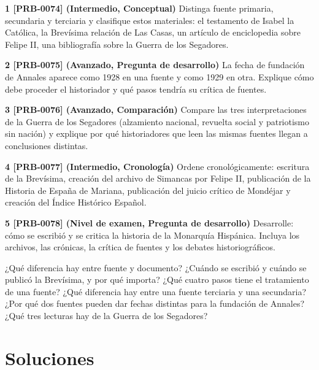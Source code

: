 \documentclass{book}
\begin{document}
\begin{tcolorbox}[title={Ejercicios}, studiumworked, breakable]

\noindent\textbf{1 [PRB-0074] (Intermedio, Conceptual)}
Distinga fuente primaria, secundaria y terciaria y clasifique estos materiales: el testamento de Isabel la Católica, la Brevísima relación de Las Casas, un artículo de enciclopedia sobre Felipe II, una bibliografía sobre la Guerra de los Segadores.


\noindent\textbf{2 [PRB-0075] (Avanzado, Pregunta de desarrollo)}
La fecha de fundación de Annales aparece como 1928 en una fuente y como 1929 en otra. Explique cómo debe proceder el historiador y qué pasos tendría su crítica de fuentes.


\noindent\textbf{3 [PRB-0076] (Avanzado, Comparación)}
Compare las tres interpretaciones de la Guerra de los Segadores (alzamiento nacional, revuelta social y patriotismo sin nación) y explique por qué historiadores que leen las mismas fuentes llegan a conclusiones distintas.


\noindent\textbf{4 [PRB-0077] (Intermedio, Cronología)}
Ordene cronológicamente: escritura de la Brevísima, creación del archivo de Simancas por Felipe II, publicación de la Historia de España de Mariana, publicación del juicio crítico de Mondéjar y creación del Índice Histórico Español.


\noindent\textbf{5 [PRB-0078] (Nivel de examen, Pregunta de desarrollo)}
Desarrolle: cómo se escribió y se critica la historia de la Monarquía Hispánica. Incluya los archivos, las crónicas, la crítica de fuentes y los debates historiográficos.

\end{tcolorbox}

\begin{tcolorbox}[title={Autoficha}, studiumcheck, breakable]

¿Qué diferencia hay entre fuente y documento? ¿Cuándo se escribió y cuándo se publicó la Brevísima, y por qué importa? ¿Qué cuatro pasos tiene el tratamiento de una fuente? ¿Qué diferencia hay entre una fuente terciaria y una secundaria? ¿Por qué dos fuentes pueden dar fechas distintas para la fundación de Annales? ¿Qué tres lecturas hay de la Guerra de los Segadores?

\end{tcolorbox}
\appendix
\chapter{Soluciones}
\end{document}
